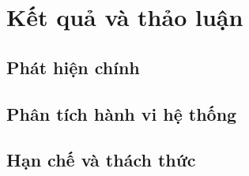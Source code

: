 \chapter{Kết quả và thảo luận}
\section{Phát hiện chính}
\section{Phân tích hành vi hệ thống}
\section{Hạn chế và thách thức}
